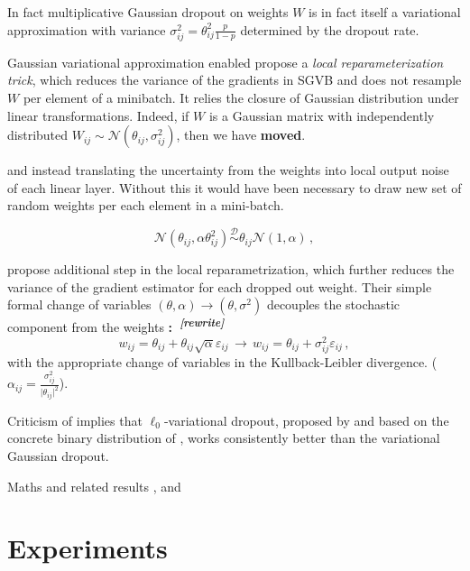 \documentclass[a4paper,10pt]{article}
\newcommand{\important}[1]{\textbf{\color{red} #1}}
\newcommand{\attn}[2]{\textbf{\color{red} #2~\textsuperscript{\textit{[#1]}}}}
\newcommand{\rewrite}[1]{\attn{rewrite}{#1}}
\begin{document}
In fact multiplicative Gaussian dropout on weights $W$ is in fact itself a variational
approximation with variance $\sigma^2_{ij} = \theta_{ij}^2 \tfrac{p}{1-p}$ determined
by the dropout rate.


Gaussian variational approximation enabled \cite{kingma_variational_2015} propose a
\textit{local reparameterization trick}, which reduces the variance of the gradients
in SGVB and does not resample $W$ per element of a minibatch. It relies the closure
of Gaussian distribution under linear transformations. Indeed, if $W$ is a Gaussian
matrix with independently distributed $
  W_{ij} \sim \mathcal{N}(\theta_{ij}, \sigma^2_{ij})
$, then we have \important{moved}.



and instead
translating the uncertainty from the weights into local output noise of each linear layer.
Without this it would have been necessary to draw new set of random weights per each element
in a mini-batch.

$$
  \mathcal{N}(\theta_{ij}, \alpha \theta^2_{ij})
  \overset{\mathcal{D}}{\sim}
  \theta_{ij} \mathcal{N}(1, \alpha)
  \,, $$

\cite{molchanov_variational_2017} propose additional step in the local reparametrization,
which further reduces the variance of the gradient estimator for each dropped out
weight. Their simple formal change of variables $(\theta, \alpha) \to (\theta, \sigma^2)$
decouples the stochastic component from the weights \rewrite:
$$
  w_{ij} = \theta_{ij} + \theta_{ij} \sqrt{\alpha} \varepsilon_{ij}
  \,\to\,
  w_{ij} = \theta_{ij} + \sigma^2_{ij} \varepsilon_{ij}
  \,, $$
with the appropriate change of variables in the Kullback-Leibler divergence.
($\alpha_{ij} = \tfrac{\sigma_{ij}^2}{\lvert \theta_{ij}\rvert^2}$).

Criticism of \cite{gale_state_2019} implies that $\ell_0$-variational dropout,
proposed by \cite{louizos_learning_2017} and based on the concrete binary distribution
of \cite{maddison_concrete_2016}, works consistently better than the variational
Gaussian dropout.

Maths and related results \cite{pav_moments_2015,taubock_complex-valued_2012},
and \cite{karseras_caution:_2014}


\section{Experiments} %
\label{sec:Experiments}
\end{document}
